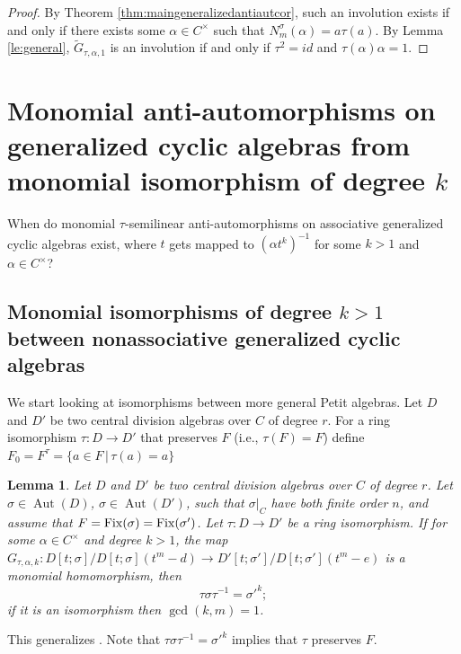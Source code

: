 \documentclass{amsart}
\theoremstyle{plain}
\newtheorem{lemma}[theorem]{Lemma}
\theoremstyle{definition}
\numberwithin{equation}{section}
\numberwithin{figure}{section}
\DeclareMathOperator{\Aut}{Aut}
\begin{document}
\begin{proof}
By Theorem \ref{thm:maingeneralizedantiautcor}, such an involution exists if and only if there exists  some $\alpha\in C^\times$ such that
$N^\sigma_{m}(\alpha)= a\tau(a).$ By Lemma \ref{le:general}, $\widetilde G_{\tau,\alpha,1}$ is an involution if and only if $\tau^2=id$ and
 $ \tau(\alpha)\alpha=1.$
\end{proof}

\section{Monomial anti-automorphisms  on generalized cyclic algebras from monomial isomorphism of degree $k$}


When do monomial $\tau$-semilinear anti-automorphisms on associative generalized cyclic algebras exist, where $t$ gets mapped to $(\alpha t^k)^{-1}$ for some $k>1$ and $\alpha \in C^\times$?

\subsection{Monomial  isomorphisms of degree $k>1$ between nonassociative generalized cyclic algebras}

We start looking at isomorphisms between more general Petit algebras. Let $D$ and $D'$ be two central division algebras over $C$ of degree $r$.
For a ring isomorphism $\tau:D\to D'$ that preserves $F$ (i.e., $\tau(F)=F$) define $F_0=F^\tau=\{a\in F\,|\,\tau(a)=a \}$

\begin{lemma}\label{L:k=1}
Let $D$ and $D'$ be two central division algebras over $C$ of degree $r$. Let $\sigma\in \Aut (D)$, $\sigma\in \Aut (D')$,
such that $\sigma|_{C}$ have both finite order $n$,  and assume that $F={\rm Fix}(\sigma)={\rm Fix}(\sigma')$.
 Let $\tau:D\to D'$ be a ring isomorphism.
      If for some  $\alpha\in C^\times$ and degree $k>1$, the map $G_{\tau,\alpha,k}:D[t;\sigma]/D[t;\sigma](t^m-d)\to D'[t;\sigma']/D[t;\sigma'](t^m-e)$ is a monomial homomorphism, then $$ \tau\sigma \tau^{-1}={\sigma'}^k;$$
       if it is an isomorphism then $\gcd(k,m)=1$.
\end{lemma}

This generalizes \cite[Lemma 4.3]{NevPum2025}. Note that $ \tau\sigma \tau^{-1}={\sigma'}^k$ implies that $\tau$ preserves $F$.
\end{document}

